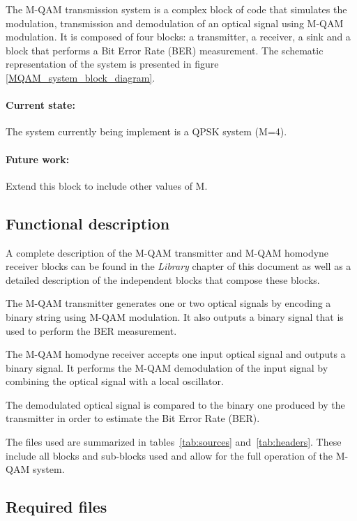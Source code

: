 The M-QAM transmission system is a complex block of code that simulates the modulation, transmission and
demodulation of an optical signal using M-QAM modulation.
It is composed of four blocks: a transmitter, a receiver, a sink and a block that performs a Bit Error Rate (BER) measurement. The schematic representation of the
system is presented in figure \ref{MQAM_system_block_diagram}.

\paragraph{Current state:} The system currently being implement is a QPSK system (M=4).

\paragraph{Future work:} Extend this block to include other values of M.

\subsection*{Functional description}

A complete description of the M-QAM transmitter and M-QAM homodyne receiver blocks can be found in the \textit{Library} chapter of this document as well as a detailed description of the independent blocks that compose these blocks.

The M-QAM transmitter generates one or two optical signals by encoding a binary string using M-QAM modulation. It also outputs a binary signal that is used to perform the BER measurement.

The M-QAM homodyne receiver accepts one input optical signal and outputs
a binary signal. It performs the M-QAM demodulation of the input signal by combining the optical signal with a local oscillator.

The demodulated optical signal is compared to the binary one produced by the transmitter in order to estimate the Bit Error Rate (BER).

The files used are summarized in tables~\ref{tab:sources} and~\ref{tab:headers}. These include all blocks and sub-blocks used and allow for the full operation of the M-QAM system.

\subsection*{Required files}\label{Required files}

